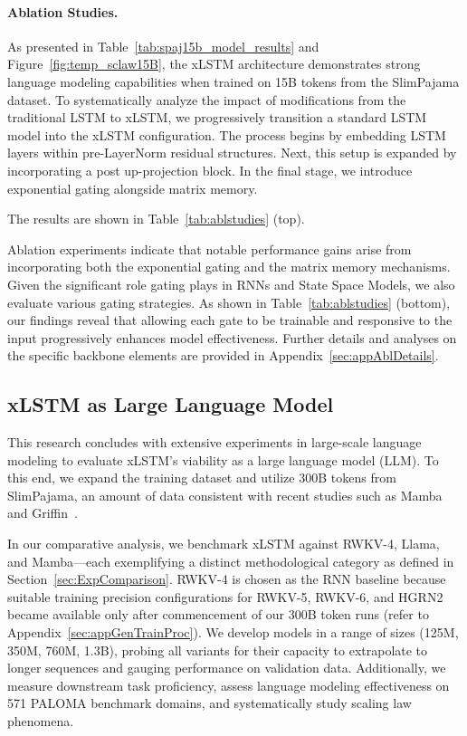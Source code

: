 \paragraph{Ablation Studies.}
As presented in Table~\ref{tab:spaj15b_model_results} and Figure~\ref{fig:temp_sclaw15B}, the xLSTM architecture demonstrates strong language modeling capabilities when trained on 15B tokens from the SlimPajama dataset. To systematically analyze the impact of modifications from the traditional LSTM to xLSTM, we progressively transition a standard LSTM model into the xLSTM configuration. The process begins by embedding LSTM layers within pre-LayerNorm residual structures. Next, this setup is expanded by incorporating a post up-projection block. In the final stage, we introduce exponential gating alongside matrix memory.

The results are shown in Table~\ref{tab:ablstudies} (top). 

Ablation experiments indicate that notable performance gains arise from incorporating both the exponential gating and the matrix memory mechanisms. Given the significant role gating plays in RNNs and State Space Models, we also evaluate various gating strategies. As shown in Table~\ref{tab:ablstudies} (bottom), our findings reveal that allowing each gate to be trainable and responsive to the input progressively enhances model effectiveness. Further details and analyses on the specific backbone elements are provided in Appendix~\ref{sec:appAblDetails}.

\subsection{xLSTM as Large Language Model}
\label{sec:ExpLanguage}

This research concludes with extensive experiments in large-scale language modeling to evaluate xLSTM’s viability as a large language model (LLM). To this end, we expand the training dataset and utilize 300B tokens from SlimPajama, an amount of data consistent with recent studies such as Mamba~\citep{Gu:24arxiv} and Griffin~\citep{De:24arxiv}.

In our comparative analysis, we benchmark xLSTM against RWKV-4, Llama, and Mamba—each exemplifying a distinct methodological category as defined in Section~\ref{sec:ExpComparison}.
RWKV-4 is chosen as the RNN baseline because suitable training precision configurations for RWKV-5, RWKV-6, and HGRN2 became available only after commencement of our 300B token runs (refer to Appendix~\ref{sec:appGenTrainProc}).
We develop models in a range of sizes (125M, 350M, 760M, 1.3B), probing all variants for their capacity to extrapolate to longer sequences and gauging performance on validation data. Additionally, we measure downstream task proficiency, assess language modeling effectiveness on 571 PALOMA benchmark domains, and systematically study scaling law phenomena.

